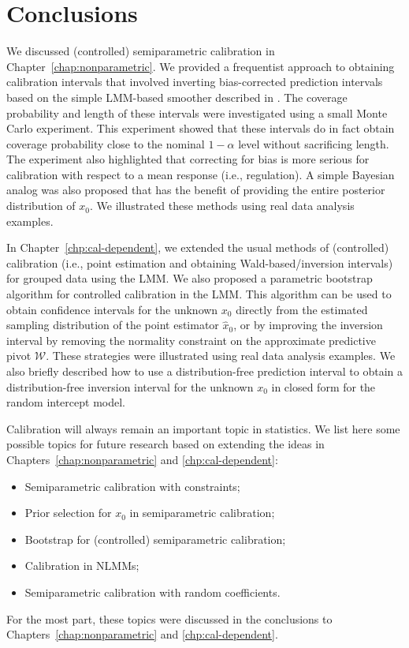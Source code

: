 \documentclass[cmfont,usenames,dvipsnames,leqno]{afit-etd}\usepackage[]{graphicx}\usepackage[]{color}
\begin{document}
\section{Conclusions}
We discussed (controlled) semiparametric calibration in Chapter~\ref{chap:nonparametric}. We provided a frequentist approach to obtaining calibration intervals that involved inverting bias-corrected prediction intervals based on the simple LMM-based smoother described in \citet{ruppert_semiparametric_2003}. The coverage probability and length of these intervals were investigated using a small Monte Carlo experiment. This experiment showed that these intervals do in fact obtain coverage probability close to the nominal $1-\alpha$ level without sacrificing length. The experiment also highlighted that correcting for bias is more serious for calibration with respect to a mean response (i.e., regulation). A simple Bayesian analog was also proposed that has the benefit of providing the entire posterior distribution of $x_0$. We illustrated these methods using real data analysis examples.

In Chapter~\ref{chp:cal-dependent}, we extended the usual methods of (controlled) calibration (i.e., point estimation and obtaining Wald-based/inversion intervals) for grouped data using the LMM. We also proposed a parametric bootstrap algorithm for controlled calibration in the LMM. This algorithm can be used to obtain confidence intervals for the unknown $x_0$ directly from the estimated sampling distribution of the point estimator $\widehat{x}_0$, or by improving the inversion interval by removing the normality constraint on the approximate predictive pivot $\mathcal{W}$. These strategies were illustrated using real data analysis examples. We also briefly described how to use a distribution-free prediction interval to obtain a distribution-free inversion interval for the unknown $x_0$ in closed form for the random intercept model.

Calibration will always remain an important topic in statistics. We list here some possible topics for future research based on extending the ideas in Chapters~\ref{chap:nonparametric} and \ref{chp:cal-dependent}:
\begin{itemize}
  \item Semiparametric calibration with constraints;
  \item Prior selection for $x_0$ in semiparametric calibration;
  \item Bootstrap for (controlled) semiparametric calibration;
  \item Calibration in NLMMs;
  \item Semiparametric calibration with random coefficients.
\end{itemize}
For the most part, these topics were discussed in the conclusions to Chapters~\ref{chap:nonparametric} and \ref{chp:cal-dependent}.
\end{document}
